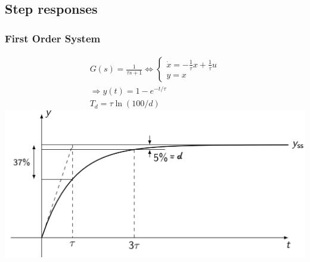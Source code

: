 \subsection{Step responses}
    \subsubsection{First Order System}
        \begin{align*}
            G(s) = \frac{1}{\tau s + 1} \Leftrightarrow 
            \begin{cases*}
                \dot{x} = -\frac{1}{\tau} x + \frac{1}{\tau} u\\
                y = x
            \end{cases*}\\
            \Rightarrow y(t) = 1-e^{-t/\tau}\\
            T_d = \tau \ln(100/d)
        \end{align*}
        \includegraphics[width = \linewidth]{src/images/first_order_step_response.png}

